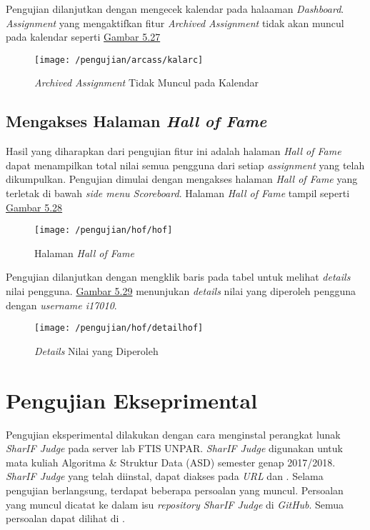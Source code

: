 	Pengujian dilanjutkan dengan mengecek kalendar pada halaaman \textit{Dashboard}. \textit{Assignment} yang mengaktifkan fitur \textit{Archived Assignment} tidak akan muncul pada kalendar seperti \hyperref[fig:kalarc]{Gambar 5.27}
	\begin{figure}[H]
		\centering  
		\texttt{[image: /pengujian/arcass/kalarc]}  
		\caption[\textit{Archived Assignment} Tidak Muncul pada Kalendar]{\textit{Archived Assignment} Tidak Muncul pada Kalendar} 
		\label{fig:kalarc} 
	\end{figure}

	\subsection{Mengakses Halaman \textit{Hall of Fame}}
	Hasil yang diharapkan dari pengujian fitur ini adalah halaman \textit{Hall of Fame} dapat menampilkan total nilai semua pengguna dari setiap \textit{assignment} yang telah dikumpulkan. Pengujian dimulai dengan mengakses halaman \textit{Hall of Fame} yang terletak di bawah \textit{side menu Scoreboard}. Halaman \textit{Hall of Fame} tampil seperti \hyperref[fig:halhof]{Gambar 5.28}
	\begin{figure}[H]
		\centering  
		\texttt{[image: /pengujian/hof/hof]}  
		\caption[Halaman \textit{Hall of Fame}]{Halaman \textit{Hall of Fame}} 
		\label{fig:halhof} 
	\end{figure}

	Pengujian dilanjutkan dengan mengklik baris pada tabel untuk melihat \textit{details} nilai pengguna. \hyperref[fig:dethof]{Gambar 5.29} menunjukan \textit{details} nilai yang diperoleh pengguna dengan \textit{username i17010}.
	\begin{figure}[H]
		\centering  
		\texttt{[image: /pengujian/hof/detailhof]}  
		\caption[\textit{Details} Nilai yang Diperoleh]{\textit{Details} Nilai yang Diperoleh} 
		\label{fig:dethof} 
	\end{figure}
	
\section{Pengujian Ekseprimental}
Pengujian eksperimental dilakukan dengan cara menginstal perangkat lunak \textit{SharIF Judge} pada server lab FTIS UNPAR. \textit{SharIF Judge} digunakan untuk mata kuliah Algoritma \& Struktur Data (ASD) semester genap 2017/2018. \textit{SharIF Judge} yang telah diinstal, dapat diakses pada \textit{URL}  dan . Selama pengujian berlangsung, terdapat beberapa persoalan yang muncul. Persoalan yang muncul dicatat ke dalam isu \textit{repository SharIF Judge} di \textit{GitHub}. Semua persoalan dapat dilihat di .

